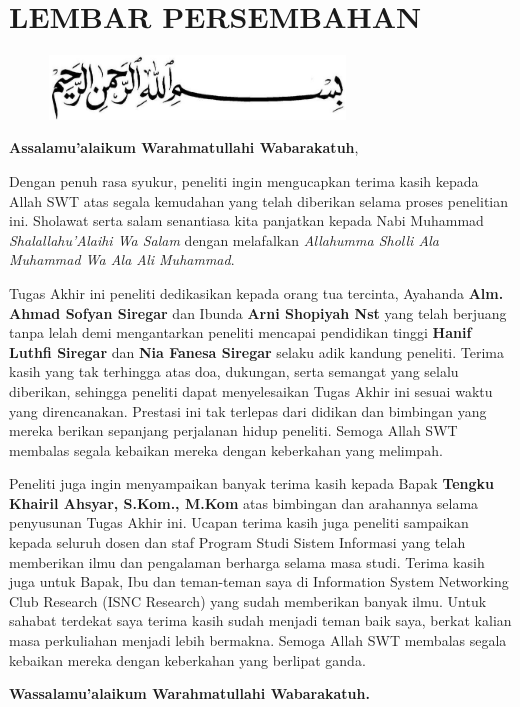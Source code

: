 %
%
%
%

\chapter*{LEMBAR PERSEMBAHAN}

\begin{figure}
	\centering
	\includegraphics[width=0.7\textwidth]{konten/gambar/bismillah.jpg}
\end{figure}

\textbf{Assalamu’alaikum Warahmatullahi Wabarakatuh},

Dengan penuh rasa syukur, peneliti ingin mengucapkan terima kasih kepada Allah SWT atas segala kemudahan yang telah diberikan selama proses penelitian ini. Sholawat serta salam senantiasa kita panjatkan kepada Nabi Muhammad \textit{Shalallahu’Alaihi Wa Salam} dengan melafalkan \textit{Allahumma Sholli Ala Muhammad Wa Ala Ali Muhammad}.

Tugas Akhir ini peneliti dedikasikan kepada orang tua tercinta, Ayahanda \textbf{Alm. Ahmad Sofyan Siregar} dan Ibunda \textbf{Arni Shopiyah Nst} yang telah berjuang tanpa lelah demi mengantarkan peneliti mencapai pendidikan tinggi \textbf{Hanif Luthfi Siregar} dan \textbf{Nia Fanesa Siregar} selaku adik kandung peneliti. Terima kasih yang tak terhingga atas doa, dukungan, serta semangat yang selalu diberikan, sehingga peneliti dapat menyelesaikan Tugas Akhir ini sesuai waktu yang direncanakan. Prestasi ini tak terlepas dari didikan dan bimbingan yang mereka berikan sepanjang perjalanan hidup peneliti. Semoga Allah SWT membalas segala kebaikan mereka dengan keberkahan yang melimpah.

Peneliti juga ingin menyampaikan banyak terima kasih kepada Bapak \textbf{Tengku Khairil Ahsyar, S.Kom., M.Kom} atas bimbingan dan arahannya selama penyusunan Tugas Akhir ini. Ucapan terima kasih juga peneliti sampaikan kepada seluruh dosen dan staf Program Studi Sistem Informasi yang telah memberikan ilmu dan pengalaman berharga selama masa studi. Terima kasih juga untuk Bapak, Ibu dan teman-teman saya di Information System Networking Club Research (ISNC Research) yang sudah memberikan banyak ilmu. Untuk sahabat terdekat saya terima kasih sudah menjadi teman baik saya, berkat kalian masa perkuliahan menjadi lebih bermakna. Semoga Allah SWT membalas segala kebaikan mereka dengan keberkahan yang berlipat ganda.

\textbf{Wassalamu’alaikum Warahmatullahi Wabarakatuh.}